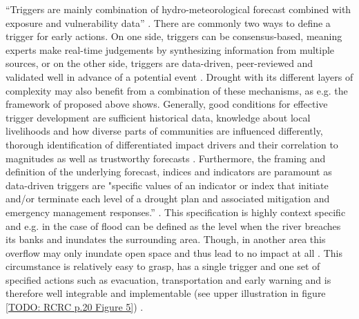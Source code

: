 “Triggers are mainly combination of hydro-meteorological forecast combined with exposure and vulnerability data” \autocite[19]{rcrcFORECASTBASEDFINANCINGEARLY2020}. There are commonly two ways to define a trigger for early actions. On one side, triggers can be consensus-based, meaning experts make real-time judgements by synthesizing information from multiple sources, or on the other side, triggers are data-driven, peer-reviewed and validated well in advance of a potential event \autocite{rcrcFORECASTBASEDFINANCINGEARLY2020}. Drought with its different layers of complexity may also benefit from a combination of these mechanisms, as e.g. the framework of \autocite{boultDroughtImpactbasedForecasting2022} proposed above shows. Generally, good conditions for effective trigger development are sufficient historical data, knowledge about local livelihoods and how diverse parts of communities are influenced differently, thorough identification of differentiated impact drivers and their correlation to magnitudes as well as trustworthy forecasts \autocite{coughlandeperezForecastbasedFinancingApproach2015,coughlandeperezActionbasedFloodForecasting2016,elisabethstephensFORECASTBASEDACTION2015,harrowsmithFutureForecastImpact2020,rcrcFORECASTBASEDFINANCINGEARLY2020}. 
Furthermore, the framing and definition of the underlying forecast, indices and indicators are paramount as data-driven triggers are "specific values of an indicator or index that initiate and/or terminate each level of a drought plan and associated mitigation and emergency management responses.” \autocites{rcrcFORECASTBASEDFINANCINGEARLY2020}[13]{svobodaHandbookDroughtIndicators2016}. This specification is highly context specific and e.g. in the case of flood can be defined as the level when the river breaches its banks and inundates the surrounding area. Though, in another area this overflow may only inundate open space and thus lead to no impact at all \autocite{elisabethstephensFORECASTBASEDACTION2015}. This circumstance is relatively easy to grasp, has a single trigger and one set of specified actions such as evacuation, transportation and early warning and is therefore well integrable and implementable (see upper illustration in figure \ref*{TODO: RCRC p.20 Figure 5}) \autocite{siahaanForecastbasedActionDREF2018}. 


